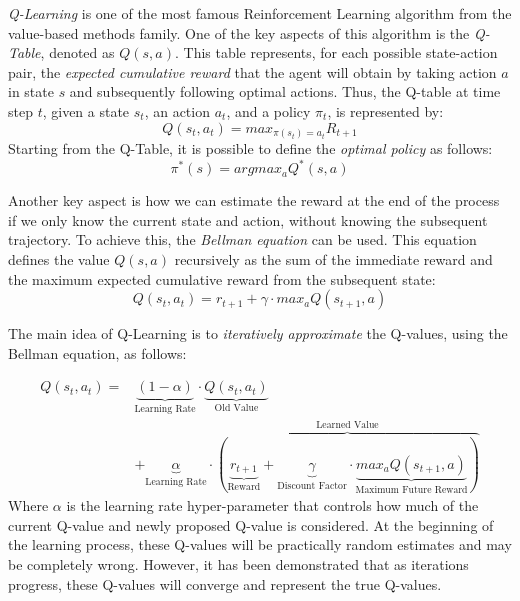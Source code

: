 \documentclass[12pt,a4paper,openright,twoside]{book}
\begin{document}
\emph{Q-Learning} is one of the most famous Reinforcement Learning algorithm from the value-based methods family. 
    One of the key aspects of this algorithm is the \emph{Q-Table}, denoted as $Q(s,a)$. This table represents, 
    for each possible state-action pair, the \emph{expected cumulative reward} that the agent will obtain by
    taking action $a$ in state $s$ and subsequently following optimal actions. 
    Thus, the Q-table at time step $t$, given a state $s_t$, an action $a_t$, and a policy $\pi_t$, is represented by:
    $$ Q(s_t, a_t) = max_{\pi(s_t) = a_t} R_{t+1}$$
    Starting from the Q-Table, it is possible to define the \emph{optimal policy} as follows:
    $$ \pi^{*}(s) = argmax_a Q^{*}(s,a) $$

Another key aspect is how we can estimate the reward at the end of the process if we only know the current state 
    and action, without knowing the subsequent trajectory. To achieve this, the \emph{Bellman equation} can be used. 
    This equation defines the value $Q(s,a)$ recursively 
    as the sum of the immediate reward and the maximum expected cumulative reward from the subsequent state:
    $$ Q(s_t,a_t) =  r_{t+1} + \gamma \cdot max_a Q(s_{t+1}, a)$$

The main idea of Q-Learning is to \emph{iteratively approximate} the Q-values, using the Bellman equation, as follows:

\begin{equation}
\begin{split}
Q(s_t,a_t) = 
    & \underbrace{
        (1-\alpha) 
    }_\text{Learning Rate}   
    \cdot 
    \underbrace{
        Q(s_t,a_t) 
    }_\text{Old Value} \\
    & + 
    \underbrace{
        \alpha
    }_\text{Learning Rate}
    \cdot 
    \overbrace{
        (
        \underbrace{
            r_{t+1}
        }_\text{Reward}
        + 
        \underbrace{
            \gamma
        }_\text{Discount Factor}
        \cdot 
        \underbrace{
        max_a Q(s_{t+1}, a)
        }_\text{Maximum Future Reward}
        )
    }^\text{Learned Value}
\end{split}
\end{equation}
    Where $\alpha$ is the learning rate hyper-parameter that controls how much of the current Q-value and newly proposed
    Q-value is considered.
    At the beginning of the learning process, these Q-values will be practically random estimates and may be completely wrong. 
    However, it has been demonstrated that as iterations progress, these Q-values will 
    converge and represent the true Q-values.
\end{document}

